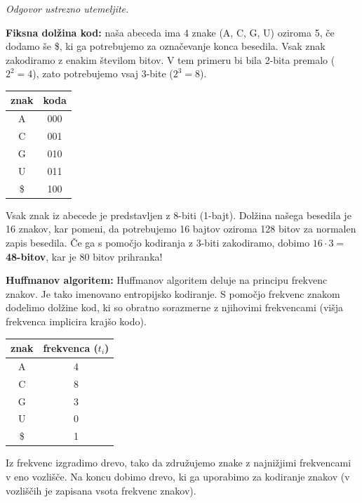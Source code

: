 \documentclass{article}
\begin{document}
\begin{enumerate}
\begin{enumerate}
			\textit{Odgovor ustrezno utemeljite.}

			\textbf{Fiksna dolžina kod:} naša abeceda ima 4 znake (A, C, G, U) oziroma 5,
			če dodamo še \$, ki ga potrebujemo za označevanje konca besedila. Vsak znak
			zakodiramo z enakim številom bitov. V tem primeru bi bila 2-bita premalo ($2^2=4$),
			zato potrebujemo vsaj 3-bite ($2^3=8$).

			\begin{center}
				\begin{tabular}{c|c}
					znak & koda \\
					\hline
					A & 000 \\
					C & 001 \\
					G & 010 \\
					U & 011 \\
					\$ & 100 \\
				\end{tabular}
			\end{center}

			Vsak znak iz abecede je predstavljen z 8-biti (1-bajt). Dolžina našega besedila
			je 16 znakov, kar pomeni, da potrebujemo 16 bajtov oziroma 128 bitov za normalen
			zapis besedila. Če ga s pomočjo kodiranja z 3-biti zakodiramo, dobimo
			$16 \cdot 3 = $ \textbf{48-bitov}, kar je 80 bitov prihranka!

			\textbf{Huffmanov algoritem:} Huffmanov algoritem deluje na principu frekvenc 
			znakov. Je tako imenovano entropijsko kodiranje. S pomočjo frekvenc znakom
			dodelimo dolžine kod, ki so obratno sorazmerne z njihovimi frekvencami (višja
			frekvenca implicira krajšo kodo).

			\begin{center}
				\begin{tabular}{c|c}
					znak & frekvenca ($t_i$) \\
					\hline
					A & 4 \\
					C & 8 \\
					G & 3 \\
					U & 0 \\
					\$ & 1 \\
				\end{tabular}
			\end{center}

			Iz frekvenc izgradimo drevo, tako da združujemo znake z najnižjimi frekvencami
			v eno vozlišče. Na koncu dobimo drevo, ki ga uporabimo za kodiranje znakov
			(v vozliščih je zapisana vsota frekvenc znakov). 


\end{enumerate}
\end{enumerate}
\end{document}
